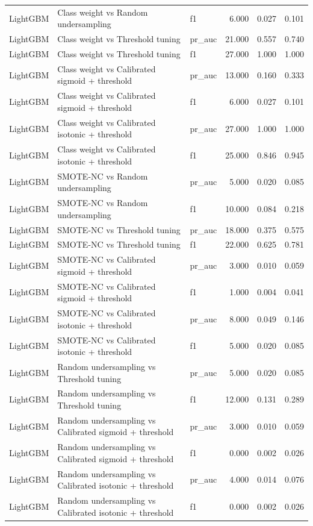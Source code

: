 \begin{tabular}{lllrrr}
LightGBM & Class weight vs Random undersampling & f1 & 6.000 & 0.027 & 0.101 \\
LightGBM & Class weight vs Threshold tuning & pr_auc & 21.000 & 0.557 & 0.740 \\
LightGBM & Class weight vs Threshold tuning & f1 & 27.000 & 1.000 & 1.000 \\
LightGBM & Class weight vs Calibrated sigmoid + threshold & pr_auc & 13.000 & 0.160 & 0.333 \\
LightGBM & Class weight vs Calibrated sigmoid + threshold & f1 & 6.000 & 0.027 & 0.101 \\
LightGBM & Class weight vs Calibrated isotonic + threshold & pr_auc & 27.000 & 1.000 & 1.000 \\
LightGBM & Class weight vs Calibrated isotonic + threshold & f1 & 25.000 & 0.846 & 0.945 \\
LightGBM & SMOTE-NC vs Random undersampling & pr_auc & 5.000 & 0.020 & 0.085 \\
LightGBM & SMOTE-NC vs Random undersampling & f1 & 10.000 & 0.084 & 0.218 \\
LightGBM & SMOTE-NC vs Threshold tuning & pr_auc & 18.000 & 0.375 & 0.575 \\
LightGBM & SMOTE-NC vs Threshold tuning & f1 & 22.000 & 0.625 & 0.781 \\
LightGBM & SMOTE-NC vs Calibrated sigmoid + threshold & pr_auc & 3.000 & 0.010 & 0.059 \\
LightGBM & SMOTE-NC vs Calibrated sigmoid + threshold & f1 & 1.000 & 0.004 & 0.041 \\
LightGBM & SMOTE-NC vs Calibrated isotonic + threshold & pr_auc & 8.000 & 0.049 & 0.146 \\
LightGBM & SMOTE-NC vs Calibrated isotonic + threshold & f1 & 5.000 & 0.020 & 0.085 \\
LightGBM & Random undersampling vs Threshold tuning & pr_auc & 5.000 & 0.020 & 0.085 \\
LightGBM & Random undersampling vs Threshold tuning & f1 & 12.000 & 0.131 & 0.289 \\
LightGBM & Random undersampling vs Calibrated sigmoid + threshold & pr_auc & 3.000 & 0.010 & 0.059 \\
LightGBM & Random undersampling vs Calibrated sigmoid + threshold & f1 & 0.000 & 0.002 & 0.026 \\
LightGBM & Random undersampling vs Calibrated isotonic + threshold & pr_auc & 4.000 & 0.014 & 0.076 \\
LightGBM & Random undersampling vs Calibrated isotonic + threshold & f1 & 0.000 & 0.002 & 0.026 \\

\end{tabular}
